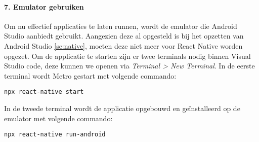 \paragraph{7. Emulator gebruiken} \label{par:emulatorgebruiken}
Om nu effectief applicaties te laten runnen, wordt de emulator die Android Studio aanbiedt gebruikt. 
Aangezien deze al opgesteld is bij het opzetten van Android Studio \ref{se:native}, 
moeten deze niet meer voor React Native worden opgezet. Om de applicatie te starten zijn er twee terminals nodig 
binnen Visual Studio code, deze kunnen we openen via \textit{Terminal > New Terminal}. 
In de eerste terminal wordt \Gls{Metro} gestart met volgende commando:
\begin{verbatim}
npx react-native start
\end{verbatim}
In de tweede terminal wordt de applicatie opgebouwd en geïnstalleerd op de emulator met volgende commando:
\begin{verbatim}
npx react-native run-android
\end{verbatim}